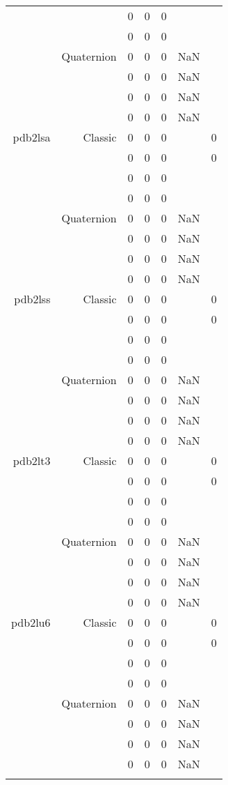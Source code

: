 \begin{xltabular}{\textwidth}{r|rcccSc}
& & 0 & 0 & 0 & & \\
& & 0 & 0 & 0 & & \\
& Quaternion & 0 & 0 & 0 & NaN & \\
& & 0 & 0 & 0 & NaN & \\
& & 0 & 0 & 0 & NaN & \\
& & 0 & 0 & 0 & NaN & \\ \addlinespace
pdb2lsa & Classic & 0 & 0 & 0 & & 0 \\
& & 0 & 0 & 0 & & 0 \\
& & 0 & 0 & 0 & & \\
& & 0 & 0 & 0 & & \\
& Quaternion & 0 & 0 & 0 & NaN & \\
& & 0 & 0 & 0 & NaN & \\
& & 0 & 0 & 0 & NaN & \\
& & 0 & 0 & 0 & NaN & \\ \addlinespace
pdb2lss & Classic & 0 & 0 & 0 & & 0 \\
& & 0 & 0 & 0 & & 0 \\
& & 0 & 0 & 0 & & \\
& & 0 & 0 & 0 & & \\
& Quaternion & 0 & 0 & 0 & NaN & \\
& & 0 & 0 & 0 & NaN & \\
& & 0 & 0 & 0 & NaN & \\
& & 0 & 0 & 0 & NaN & \\ \addlinespace
pdb2lt3 & Classic & 0 & 0 & 0 & & 0 \\
& & 0 & 0 & 0 & & 0 \\
& & 0 & 0 & 0 & & \\
& & 0 & 0 & 0 & & \\
& Quaternion & 0 & 0 & 0 & NaN & \\
& & 0 & 0 & 0 & NaN & \\
& & 0 & 0 & 0 & NaN & \\
& & 0 & 0 & 0 & NaN & \\ \addlinespace
pdb2lu6 & Classic & 0 & 0 & 0 & & 0 \\
& & 0 & 0 & 0 & & 0 \\
& & 0 & 0 & 0 & & \\
& & 0 & 0 & 0 & & \\
& Quaternion & 0 & 0 & 0 & NaN & \\
& & 0 & 0 & 0 & NaN & \\
& & 0 & 0 & 0 & NaN & \\
& & 0 & 0 & 0 & NaN & \\ \addlinespace

\end{xltabular}
